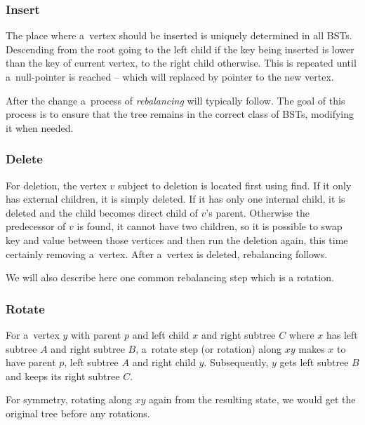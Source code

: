 \subsubsection*{Insert}
The place where a~vertex should be inserted is uniquely determined in all BSTs. Descending from the root going to the left child if the key being inserted is lower than the key of current vertex, to the right child otherwise. This is repeated until a~null-pointer is reached -- which will replaced by pointer to the new vertex. 

After the change a~process of \textit{rebalancing} will typically follow. The goal of this process is to ensure that the tree remains in the correct class of BSTs, modifying it when needed.

\subsubsection*{Delete}
For deletion, the vertex $v$ subject to deletion is located first using find. If it only has external children, it is simply deleted. If it has only one internal child, it is deleted and the child becomes direct child of $v$'s parent. Otherwise the predecessor of $v$ is found, it cannot have two children, so it is possible to swap key and value between those vertices and then run the deletion again, this time certainly removing a~vertex. After a~vertex is deleted, rebalancing follows.

We will also describe here one common rebalancing step which is a rotation.

\subsubsection*{Rotate}

For a~vertex $y$ with parent $p$ and left child $x$ and right subtree $C$ where $x$ has left subtree $A$ and right subtree $B$, a~rotate step (or rotation) along $xy$ makes $x$ to have parent $p$, left subtree $A$ and right child $y$. Subsequently, $y$ gets left subtree $B$ and keeps its right subtree $C$.

For symmetry, rotating along $xy$ again from the resulting state, we would get the original tree before any rotations.


